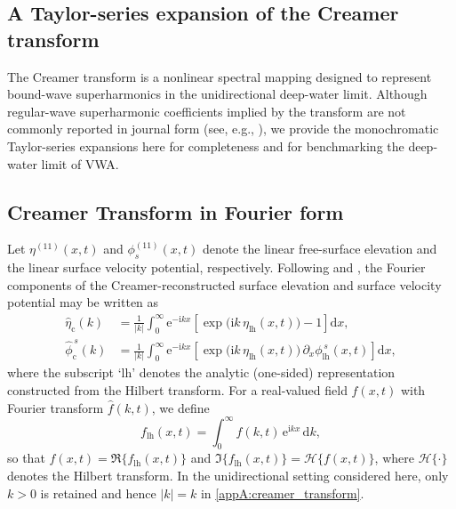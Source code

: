\documentclass[lineno]{JFM-FLM_Au}
\begin{document}
\begin{appen}
\renewcommand*{\theHsection}{app.\Alph{section}}
\renewcommand*{\theHsubsection}{\theHsection.\arabic{subsection}}

\section{A Taylor-series expansion of the Creamer transform}
\label{appA}

The Creamer transform \citep{creamer1989improved} is a nonlinear spectral mapping designed to represent bound-wave superharmonics in the unidirectional deep-water limit. Although regular-wave superharmonic coefficients implied by the transform are not commonly reported in journal form (see, e.g., \citealt{taylor1998creamer}), we provide the monochromatic Taylor-series expansions here for completeness and for benchmarking the deep-water limit of VWA.

\subsection{Creamer Transform in Fourier form}

Let $\eta^{(11)}(x,t)$ and $\phi_s^{(11)}(x,t)$ denote the linear free-surface elevation and the linear surface velocity potential, respectively. Following \citet{creamer1989improved} and \citet{gibbs_walls_2004}, the Fourier components of the Creamer-reconstructed surface elevation and surface velocity potential may be written as
\begin{subequations}\label{appA:creamer_transform}
\begin{align}
\hat\eta_{\mathrm{c}}(k)
&=\frac{1}{|k|}\int_{0}^{\infty}\! \mathrm{e}^{-\mathrm{i}kx}
\left[\exp\!\bigl(\mathrm{i}k\,\eta_{\mathrm{lh}}(x,t)\bigr)-1\right]\mathrm{d}x,
\\
\hat\phi^{\,s}_{\mathrm{c}}(k)
&=\frac{1}{|k|}\int_{0}^{\infty}\! \mathrm{e}^{-\mathrm{i}kx}
\left[\exp\!\bigl(\mathrm{i}k\,\eta_{\mathrm{lh}}(x,t)\bigr)\,
\partial_x\phi^{\,s}_{\mathrm{lh}}(x,t)\right]\mathrm{d}x,
\label{appA:Creamerphic}
\end{align}
\end{subequations}
where the subscript `lh' denotes the analytic (one-sided) representation constructed from the Hilbert transform. For a real-valued field $f(x,t)$ with Fourier transform $\hat f(k,t)$, we define
\begin{equation}\label{appA:analytic_def}
f_{\mathrm{lh}}(x,t)
=\int_{0}^{\infty}\hat f(k,t)\,\mathrm{e}^{\mathrm{i}kx}\,\mathrm{d}k,
\end{equation}
so that $f(x,t)=\Re\{f_{\mathrm{lh}}(x,t)\}$ and $\Im\{f_{\mathrm{lh}}(x,t)\}=\mathcal{H}\{f(x,t)\}$, where $\mathcal{H}\{\cdot\}$ denotes the Hilbert transform. In the unidirectional setting considered here, only $k>0$ is retained and hence $|k|=k$ in \cref{appA:creamer_transform}.


\end{appen}
\end{document}
